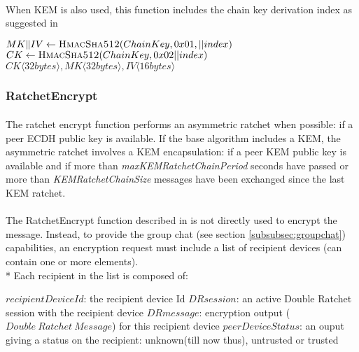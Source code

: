 \documentclass[a4paper,11pt]{article}
\begin{document}
      \paragraph*{}When KEM is also used, this function includes the chain key derivation index as suggested in \cite{secsymmratchet}
      \begin{algorithmic}
          \State $MK\Arrowvert IV \gets \Call{HmacSha512}{ChainKey, 0x01, || index}$
          \State $CK \gets \Call{HmacSha512}{ChainKey, 0x02 || index}$
          \State \Return $CK\langle 32bytes\rangle ,MK\langle 32bytes\rangle ,IV\langle 16 bytes\rangle $
        \EndFunction
      \end{algorithmic}

    \subsubsection{RatchetEncrypt}
      \paragraph{}The ratchet encrypt function performs an asymmetric ratchet when possible: if a peer ECDH public key is available. If the base algorithm includes a KEM, the asymmetric ratchet involves a KEM encapsulation: if a peer KEM public key is available and if more than \textit{maxKEMRatchetChainPeriod} seconds have passed or more than \textit{KEMRatchetChainSize} messages have been exchanged since the last KEM ratchet.
      \paragraph{}The RatchetEncrypt function described in \cite[section 3.4]{doubleRatchet} is not directly used to encrypt the message. Instead, to provide the group chat (see section \ref{subsubsec:groupchat}) capabilities, an encryption request must include a list of recipient devices (can contain one or more elements).\\*
      Each recipient in the list is composed of:
        \begin{algorithmic}
          \State $recipientDeviceId$: the recipient device Id
          \State $DRsession$: an active Double Ratchet session with the recipient device
          \State $DRmessage$: encryption output ($Double\ Ratchet\ Message$) for this recipient device
          \State $peerDeviceStatus$: an ouput giving a status on the recipient: unknown(till now thus), untrusted or trusted
        \end{algorithmic}
\end{document}
